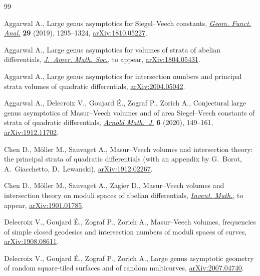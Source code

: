 \documentclass[pdftex]{sigma}
\theoremstyle{definition}
\begin{document}
\begin{thebibliography}{99}
\footnotesize\itemsep=0pt

Aggarwal A., Large genus asymptotics for {S}iegel--{V}eech constants,
 \href{https://doi.org/10.1007/s00039-019-00509-0}{\textit{Geom. Funct. Anal.}} \textbf{29} (2019), 1295--1324,
 \href{https://arxiv.org/abs/1810.05227}{arXiv:1810.05227}.

Aggarwal A., Large genus asymptotics for volumes of strata of abelian
 differentials, \href{https://doi.org/10.1090/jams/947}{\textit{J.~Amer. Math. Soc.}}, {t}o appear, \href{https://arxiv.org/abs/1804.05431}{arXiv:1804.05431}.

Aggarwal A., Large genus asymptotics for intersection numbers and principal
 strata volumes of quadratic differentials, \href{https://arxiv.org/abs/2004.05042}{arXiv:2004.05042}.

Aggarwal A., Delecroix V., Goujard \'E., Zograf P., Zorich A., Conjectural large
 genus asymptotics of {M}asur--{V}eech volumes and of area {S}iegel--{V}eech
 constants of strata of quadratic differentials, \href{https://doi.org/10.1007/s40598-020-00139-7}{\textit{Arnold Math.~J.}}
 \textbf{6} (2020), 149--161, \href{https://arxiv.org/abs/1912.11702}{arXiv:1912.11702}.

Chen D., M\"oller M., Sauvaget A., Masur--{V}eech volumes and intersection
 theory: the principal strata of quadratic differentials (with an appendix by
 G.~Borot, A.~Giacchetto, D.~Lewanski), \href{https://arxiv.org/abs/1912.02267}{arXiv:1912.02267}.

Chen D., M\"oller M., Sauvaget A., Zagier D., Masur--{V}eech volumes and
 intersection theory on moduli spaces of abelian differentials,
 \href{https://doi.org/10.1007/s00222-020-00969-4}{\textit{Invent. Math.}}, {t}o appear, \href{https://arxiv.org/abs/1901.01785}{arXiv:1901.01785}.

Delecroix V., Goujard \'E., Zograf P., Zorich A., Masur--{V}eech volumes,
 frequencies of simple closed geodesics and intersection numbers of moduli
 spaces of curves, \href{https://arxiv.org/abs/1908.08611}{arXiv:1908.08611}.

Delecroix V., Goujard \'E., Zograf P., Zorich A., Large genus asymptotic geometry
 of random square-tiled surfaces and of random multicurves,
 \href{https://arxiv.org/abs/2007.04740}{arXiv:2007.04740}.


\end{thebibliography}
\end{document}
